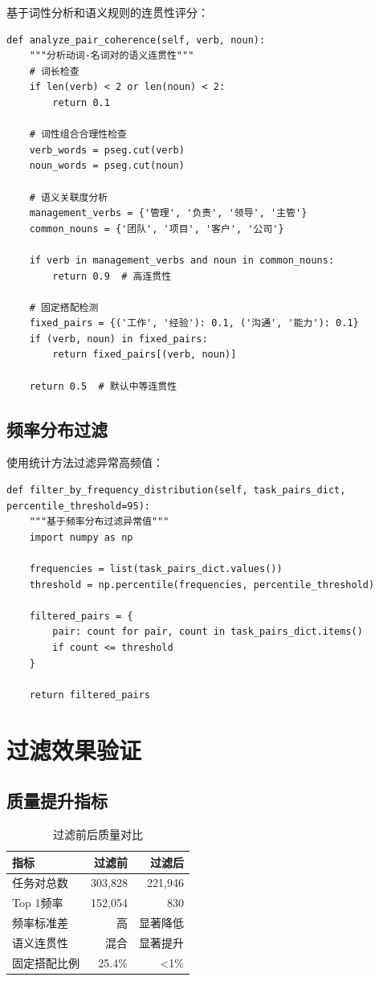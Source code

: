 \documentclass[11pt,a4paper]{article}
\begin{document}
基于词性分析和语义规则的连贯性评分：

\begin{lstlisting}[caption=语义连贯性分析]
def analyze_pair_coherence(self, verb, noun):
    """分析动词-名词对的语义连贯性"""
    # 词长检查
    if len(verb) < 2 or len(noun) < 2:
        return 0.1

    # 词性组合合理性检查
    verb_words = pseg.cut(verb)
    noun_words = pseg.cut(noun)

    # 语义关联度分析
    management_verbs = {'管理', '负责', '领导', '主管'}
    common_nouns = {'团队', '项目', '客户', '公司'}

    if verb in management_verbs and noun in common_nouns:
        return 0.9  # 高连贯性

    # 固定搭配检测
    fixed_pairs = {('工作', '经验'): 0.1, ('沟通', '能力'): 0.1}
    if (verb, noun) in fixed_pairs:
        return fixed_pairs[(verb, noun)]

    return 0.5  # 默认中等连贯性
\end{lstlisting}

\subsection{频率分布过滤}

使用统计方法过滤异常高频值：

\begin{lstlisting}[caption=频率分布过滤]
def filter_by_frequency_distribution(self, task_pairs_dict, percentile_threshold=95):
    """基于频率分布过滤异常值"""
    import numpy as np

    frequencies = list(task_pairs_dict.values())
    threshold = np.percentile(frequencies, percentile_threshold)

    filtered_pairs = {
        pair: count for pair, count in task_pairs_dict.items()
        if count <= threshold
    }

    return filtered_pairs
\end{lstlisting}

\section{过滤效果验证}

\subsection{质量提升指标}

\begin{table}[h]
\centering
\begin{tabular}{lrr}
\toprule
\textbf{指标} & \textbf{过滤前} & \textbf{过滤后} \\
\midrule
任务对总数 & 303,828 & 221,946 \\
Top 1频率 & 152,054 & 830 \\
频率标准差 & 高 & 显著降低 \\
语义连贯性 & 混合 & 显著提升 \\
固定搭配比例 & 25.4\% & <1\% \\
\bottomrule
\end{tabular}
\caption{过滤前后质量对比}
\end{table}
\end{document}

